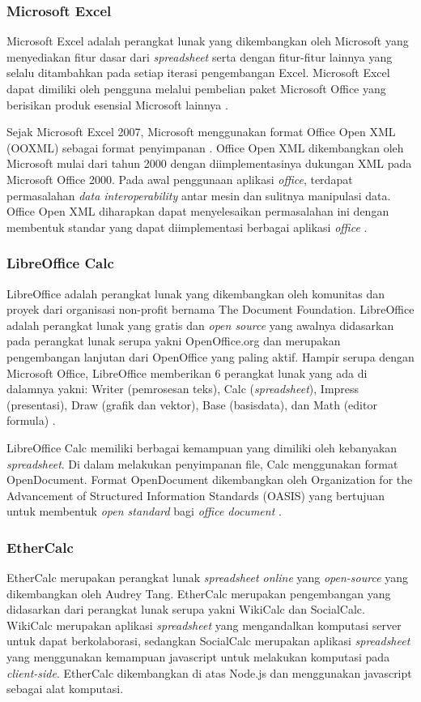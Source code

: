 \subsubsection{Microsoft Excel}
Microsoft Excel adalah perangkat lunak yang dikembangkan oleh Microsoft yang menyediakan fitur dasar dari \textit{spreadsheet} serta dengan fitur-fitur lainnya yang selalu ditambahkan pada setiap iterasi pengembangan Excel. Microsoft Excel dapat dimiliki oleh pengguna melalui pembelian paket Microsoft Office yang berisikan produk esensial Microsoft lainnya \citep{MSExcelProduct}.

Sejak Microsoft Excel 2007, Microsoft menggunakan format Office Open XML (OOXML) sebagai format penyimpanan \citep{MSExcelSupport}. Office Open XML dikembangkan oleh Microsoft mulai dari tahun 2000 dengan diimplementasinya dukungan XML pada Microsoft Office 2000. Pada awal penggunaan aplikasi \textit{office}, terdapat permasalahan \textit{data interoperability} antar mesin dan sulitnya manipulasi data. Office Open XML diharapkan dapat menyelesaikan permasalahan ini dengan membentuk standar yang dapat diimplementasi berbagai aplikasi \textit{office} \citep{OOXMLFormat}.

\subsubsection{LibreOffice Calc}
LibreOffice adalah perangkat lunak yang dikembangkan oleh komunitas dan proyek dari organisasi non-profit bernama The Document Foundation. LibreOffice adalah perangkat lunak yang gratis dan \textit{open source} yang awalnya didasarkan pada perangkat lunak serupa yakni OpenOffice.org dan merupakan pengembangan lanjutan dari OpenOffice yang paling aktif. Hampir serupa dengan Microsoft Office, LibreOffice memberikan 6 perangkat lunak yang ada di dalamnya yakni: Writer (pemrosesan teks), Calc (\textit{spreadsheet}), Impress (presentasi), Draw (grafik dan vektor), Base (basisdata), dan Math (editor formula) \citep{LibreOffice}.

LibreOffice Calc memiliki berbagai kemampuan yang dimiliki oleh kebanyakan \textit{spreadsheet}. Di dalam melakukan penyimpanan file, Calc menggunakan format OpenDocument. Format OpenDocument dikembangkan oleh Organization for the Advancement of Structured Information Standards (OASIS) yang bertujuan untuk membentuk \textit{open standard} bagi \textit{office document} \citep{OpenDocument}.

\subsubsection{EtherCalc} \label{AboutEtherCalc}
EtherCalc merupakan perangkat lunak \textit{spreadsheet online} yang \textit{open-source} yang dikembangkan oleh Audrey Tang. EtherCalc merupakan pengembangan yang didasarkan dari perangkat lunak serupa yakni WikiCalc dan SocialCalc. WikiCalc merupakan aplikasi \textit{spreadsheet} yang mengandalkan komputasi server untuk dapat berkolaborasi, sedangkan SocialCalc merupakan aplikasi \textit{spreadsheet} yang menggunakan kemampuan javascript untuk melakukan komputasi pada \textit{client-side}. EtherCalc dikembangkan di atas Node.js dan menggunakan javascript sebagai alat komputasi.

